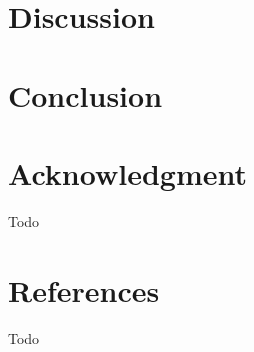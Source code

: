 \documentclass[conference]{IEEEtran}
\begin{document}
\section*{Discussion}

\section*{Conclusion}

\section*{Acknowledgment}

Todo

\section*{References}

Todo
\end{document}
